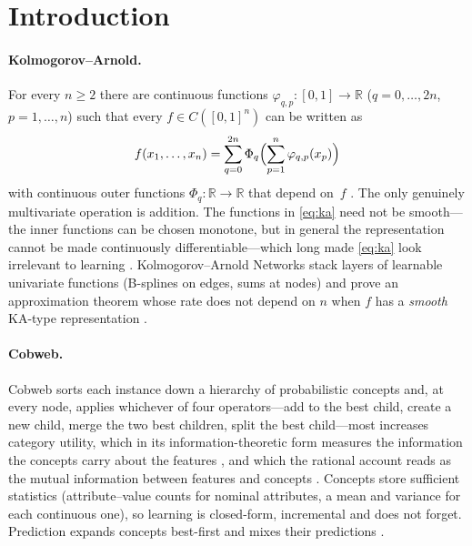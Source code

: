 \documentclass[11pt]{article}
\theoremstyle{definition}
\theoremstyle{remark}
\newcommand{\R}{\mathbb{R}}
\begin{document}
\tableofcontents

\section{Introduction}

\paragraph{Kolmogorov--Arnold.}
For every $n\ge 2$ there are continuous functions $\varphi_{q,p}:[0,1]\to\R$
($q=0,\dots,2n$, $p=1,\dots,n$) such that every $f\in C([0,1]^n)$ can be written as
\begin{equation}\label{eq:ka}
  f(x_1,\dots,x_n)=\sum_{q=0}^{2n}\Phi_q\Bigl(\sum_{p=1}^{n}\varphi_{q,p}(x_p)\Bigr)
\end{equation}
with continuous outer functions $\Phi_q:\R\to\R$ that depend on~$f$
\citep{kolmogorov1957,arnold1957,lorentz1966,sprecher1965}.  The only genuinely
multivariate operation is addition.  The functions in \eqref{eq:ka} need not be
smooth---the inner functions can be chosen monotone, but in general the representation
cannot be made continuously differentiable---which long made \eqref{eq:ka} look
irrelevant to learning \citep{girosi1989}.  Kolmogorov--Arnold Networks \citep{liu2024kan} stack layers of
learnable univariate functions (B-splines on edges, sums at nodes) and prove an
approximation theorem whose rate does not depend on $n$ when $f$ has a \emph{smooth}
KA-type representation \citep[Thm.~2.1]{liu2024kan}.

\paragraph{Cobweb.}
Cobweb \citep{fisher1987} sorts each instance down a hierarchy of probabilistic
concepts and, at every node, applies whichever of four operators---add to the best
child, create a new child, merge the two best children, split the best child---most
increases category utility, which in its information-theoretic form measures the
information the concepts carry about the features \citep{corter1992}, and which the
rational account reads as the mutual information between features and concepts
\citep{maclellan2026rational}.
Concepts store sufficient statistics (attribute--value counts for nominal attributes,
a mean and variance for each continuous one), so learning is closed-form, incremental
and does not forget.  Prediction expands concepts best-first and mixes their
predictions \citep{maclellan2026rational}.
\end{document}
